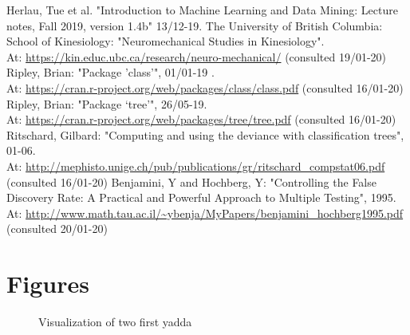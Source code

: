 \documentclass[11pt,fleqn]{article}
\begin{document}
\newpage
\begin{thebibliography}{9}
	 Herlau, Tue et al. "Introduction to Machine Learning and Data Mining: Lecture notes, Fall 2019, version 1.4b" 13/12-19.
		 The University of British Columbia: School of Kinesiology:
	"Neuromechanical Studies in Kinesiology". \\
	At:
	\url{https://kin.educ.ubc.ca/research/neuro-mechanical/} (consulted 19/01-20)
	 Ripley, Brian: "Package ’class’", 01/01-19 .\\
	At:
	\url{https://cran.r-project.org/web/packages/class/class.pdf} (consulted 16/01-20)
	 Ripley, Brian: "Package ‘tree’", 26/05-19.\\ At: \url{https://cran.r-project.org/web/packages/tree/tree.pdf} (consulted 16/01-20)
	 Ritschard, Gilbard: "Computing and using the deviance with classification trees", 01-06.\\
	 At:
	\url{http://mephisto.unige.ch/pub/publications/gr/ritschard_compstat06.pdf} (consulted 16/01-20)
	 Benjamini, Y and Hochberg, Y: "Controlling the False Discovery Rate: A Practical and Powerful Approach to Multiple Testing", 1995.\\ At:
	\url{http://www.math.tau.ac.il/~ybenja/MyPapers/benjamini_hochberg1995.pdf} (consulted 20/01-20)

\end{thebibliography}
\appendix
\newpage 
\section{Figures}
\begin{figure}[H]
	
	\centering
	\caption{Visualization of two first yadda}
	\label{fig:2dtrajects}
\end{figure}
\end{document}
